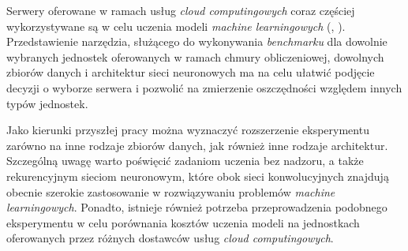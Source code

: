 \documentclass[12pt,a4paper,twoside]{article}
\begin{document}
Serwery oferowane w ramach usług \textit{cloud computingowych} coraz częściej wykorzystywane są w celu uczenia modeli \textit{machine learningowych} (\citet{calheiros2010}, \citet{github2017}). Przedstawienie narzędzia, służącego do wykonywania \textit{benchmarku} dla dowolnie wybranych jednostek oferowanych w ramach chmury obliczeniowej, dowolnych zbiorów danych i architektur sieci neuronowych ma na celu ułatwić podjęcie decyzji o wyborze serwera i pozwolić na zmierzenie oszczędności względem innych typów jednostek.

Jako kierunki przyszłej pracy można wyznaczyć rozszerzenie eksperymentu zarówno na inne rodzaje zbiorów danych, jak również inne rodzaje architektur. Szczególną uwagę warto poświęcić zadaniom uczenia bez nadzoru, a także rekurencyjnym sieciom neuronowym, które obok sieci konwolucyjnych znajdują obecnie szerokie zastosowanie w rozwiązywaniu problemów \textit{machine learningowych}. Ponadto, istnieje również potrzeba przeprowadzenia podobnego eksperymentu w celu porównania kosztów uczenia modeli na jednostkach oferowanych przez różnych dostawców usług \textit{cloud computingowych}.

\clearpage
\end{document}
